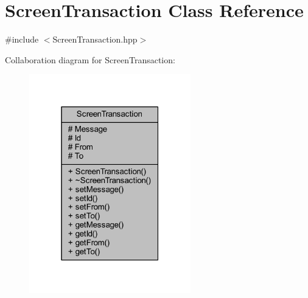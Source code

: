 \hypertarget{class_screen_transaction}{\section{Screen\-Transaction Class Reference}
\label{class_screen_transaction}
}


{\ttfamily \#include $<$Screen\-Transaction.\-hpp$>$}



Collaboration diagram for Screen\-Transaction\-:\nopagebreak
\begin{figure}[H]
\begin{center}
\leavevmode
\includegraphics[width=199pt]{class_screen_transaction__coll__graph}
\end{center}
\end{figure}
